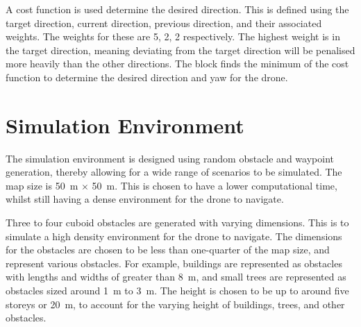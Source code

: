 A cost function is used determine the desired direction. This is defined using the target direction, current direction, previous direction, and their associated weights. The weights for these are 5, 2, 2 respectively. The highest weight is in the target direction, meaning deviating from the target direction will be penalised more heavily than the other directions. The block finds the minimum of the cost function to determine the desired direction and yaw for the drone.
\section{Simulation Environment}
The simulation environment is designed using random obstacle and waypoint generation, thereby allowing for a wide range of scenarios to be simulated. The map size is \SI{50}{\meter} $\times$ \SI{50}{\meter}. This is chosen to have a lower computational time, whilst still having a dense environment for the drone to navigate.

Three to four cuboid obstacles are generated with varying dimensions. This is to simulate a high density environment for the drone to navigate. The dimensions for the obstacles are chosen to be less than one-quarter of the map size, and represent various obstacles. For example, buildings are represented as obstacles with lengths and widths of greater than \SI{8}{\meter}, and small trees are represented as obstacles sized around \SI{1}{\meter} to \SI{3}{\meter}. The height is chosen to be up to around five storeys or \SI{20}{\meter}, to account for the varying height of buildings, trees, and other obstacles.

